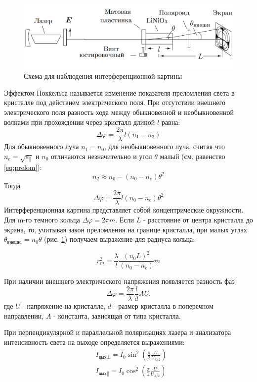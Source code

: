 \documentclass[a4paper,12pt]{article}
\begin{document}
	\begin{figure}[h!]\label{fig:interferention}
		\begin{center}
			\includegraphics[width=0.8\linewidth]{interferention_scheme}
			\caption{Схема для наблюдения интерференционной картины}
		\end{center}
	\end{figure}
	
	Эффектом Поккельса называется изменение показателя преломления света в кристалле под действием электрического поля. При отсутствии внешнего электрического поля разность хода между обыкновенной и необыкновенной волнами при прохождении через кристалл длиной $l$ равна: \[\Delta\varphi = \frac{2\pi}{\lambda}l(n_1 - n_2) \]
	Для обыкновенного луча $n_1 = n_0$, для необыкновенного луча, считая что $n_e = \sqrt{\varepsilon_{\|}}$ и $n_0$ отличаются незначительно и угол $\theta$ малый (см. равенство \eqref{eq:prelom}): \[n_2 \approx n_0 - (n_0 - n_e)\theta^2\]
	Тогда \[\Delta\varphi = \frac{2\pi}{\lambda}l(n_0 - n_e)\theta^2\]
	Интерференционная картина представляет собой концентрические окружности. Для m-го темного кольца $\Delta\varphi = 2\pi m$. Если $L$ - расстояние от центра кристалла до экрана, то, учитывая закон преломления на границе кристалла, при малых углах $\theta_{\text{внешн.}} = n_0\theta$ (рис. \ref{fig:interferention}) получаем выражение для радиуса кольца:
	
	\begin{equation}\label{eq:radius}
	r_m^2 = \frac{\lambda}{l}\frac{(n_0L)^2}{(n_0 - n_e)}m
	\end{equation}  
	
	При наличии внешнего электрического напряжения появляется разность фаз \[\Delta\varphi = \frac{2\pi}{\lambda}\frac{l}{d}AU\text{,}\] где $U$ - напряжение на кристалле, $d$ - размер кристалла в поперечном направлении, $A$ - константа, зависящая от типа кристалла.
	
	\vspace{\baselineskip}
	
	При перпендикулярной и параллельной поляризациях лазера и анализатора интенсивность света на выходе определяется выражениями:
	\begin{equation}\label{eq:intensity}
	\begin{aligned}
	&I_{\text{вых}\bot} = I_0\sin^2\left(\frac{\pi}{2}\frac{U}{U_{\lambda/2}}\right)\\
	&I_{\text{вых}\|} = I_0\cos^2\left(\frac{\pi}{2}\frac{U}{U_{\lambda/2}}\right) 
	\end{aligned}
	\end{equation} 
	
\end{document}
